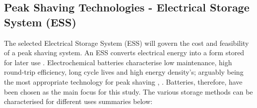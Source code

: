 \subsection{Peak Shaving Technologies - Electrical Storage System
(ESS)}\label{peak-shaving-technologies---electrical-storage-system-ess}

The selected Electrical Storage System (ESS) will govern the cost and
feasibility of a peak shaving system. An ESS converts electrical energy
into a form stored for later use \cite{Chen2009291}. Electrochemical
batteries characterise low maintenance, high round-trip efficiency, long
cycle lives and high energy density's; arguably being the most
appropriate technology for peak shaving \cite{liao2016a},
\cite{Dunn928}. Batteries, therefore, have been chosen as the main focus
for this study. The various storage methods can be characterised for
different uses summaries below:

